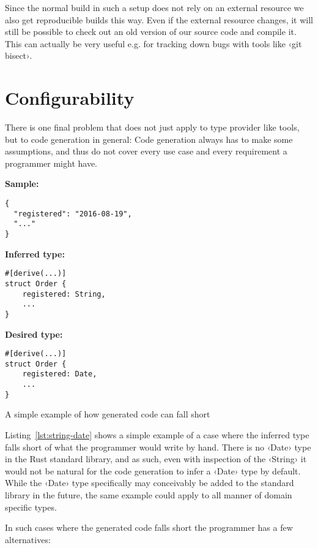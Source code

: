 Since the normal build in such a setup does not rely on an external resource we also get reproducible builds this way. Even if the external resource changes, it will still be possible to check out an old version of our source code and compile it. This can actually be very useful e.g. for tracking down bugs with tools like ‹git bisect›.

\section{Configurability}

There is one final problem that does not just apply to type provider like tools, but to code generation in general: Code generation always has to make some assumptions, and thus do not cover every use case and every requirement a programmer might have.

\begin{listing}[ht!]
\textbf{Sample:}
\begin{verbatim}
{
  "registered": "2016-08-19",
  "..."
}
\end{verbatim}
\vspace{5mm}

\textbf{Inferred type:}
\begin{verbatim}
#[derive(...)]
struct Order {
    registered: String,
    ...
}
\end{verbatim}
\vspace{5mm}

\textbf{Desired type:}
\begin{verbatim}
#[derive(...)]
struct Order {
    registered: Date,
    ...
}
\end{verbatim}
\caption{A simple example of how generated code can fall short}
\label{lst:string-date}
\end{listing}

Listing~\ref{lst:string-date} shows a simple example of a case where the inferred type falls short of what the programmer would write by hand. There is no ‹Date› type in the Rust standard library, and as such, even with inspection of the ‹String› it would not be natural for the code generation to infer a ‹Date› type by default. While the ‹Date› type specifically may conceivably be added to the standard library in the future, the same example could apply to all manner of domain specific types.

In such cases where the generated code falls short the programmer has a few alternatives:

